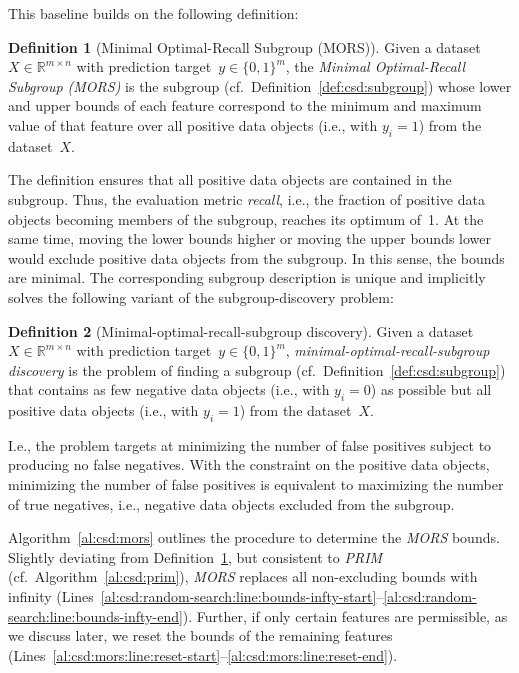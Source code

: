 \documentclass{article}
\theoremstyle{definition}
\newtheorem{definition}{Definition}
\begin{document}
This baseline builds on the following definition:
%
\begin{definition}[Minimal Optimal-Recall Subgroup (MORS)]
	Given a dataset $X \in \mathbb{R}^{m \times n}$ with prediction target~$y \in \{0, 1\}^m$,
	the \emph{Minimal Optimal-Recall Subgroup (MORS)} is the subgroup (cf.~Definition~\ref{def:csd:subgroup}) whose lower and upper bounds of each feature correspond to the minimum and maximum value of that feature over all positive data objects (i.e., with $y_i = 1$) from the dataset~$X$.
	\label{def:csd:mors}
\end{definition}
%
The definition ensures that all positive data objects are contained in the subgroup.
Thus, the evaluation metric \emph{recall}, i.e., the fraction of positive data objects becoming members of the subgroup, reaches its optimum of~1.
At the same time, moving the lower bounds higher or moving the upper bounds lower would exclude positive data objects from the subgroup.
In this sense, the bounds are minimal.
The corresponding subgroup description is unique and implicitly solves the following variant of the subgroup-discovery problem:
%
\begin{definition}[Minimal-optimal-recall-subgroup discovery]
	Given a dataset $X \in \mathbb{R}^{m \times n}$ with prediction target~$y \in \{0, 1\}^m$,
	\emph{minimal-optimal-recall-subgroup discovery} is the problem of finding a subgroup (cf.~Definition~\ref{def:csd:subgroup}) that contains as few negative data objects (i.e., with $y_i = 0$) as possible but all positive data objects (i.e., with $y_i = 1$) from the dataset~$X$.
	\label{def:csd:minimal-optimal-recall-subgroup-discovery}
\end{definition}
%
I.e., the problem targets at minimizing the number of false positives subject to producing no false negatives.
With the constraint on the positive data objects, minimizing the number of false positives is equivalent to maximizing the number of true negatives, i.e., negative data objects excluded from the subgroup.

Algorithm~\ref{al:csd:mors} outlines the procedure to determine the \emph{MORS} bounds.
Slightly deviating from Definition~\ref{def:csd:mors}, but consistent to \emph{PRIM} (cf.~Algorithm~\ref{al:csd:prim}), \emph{MORS} replaces all non-excluding bounds with infinity (Lines~\ref{al:csd:random-search:line:bounds-infty-start}--\ref{al:csd:random-search:line:bounds-infty-end}).
Further, if only certain features are permissible, as we discuss later, we reset the bounds of the remaining features (Lines~\ref{al:csd:mors:line:reset-start}--\ref{al:csd:mors:line:reset-end}).
\end{document}
